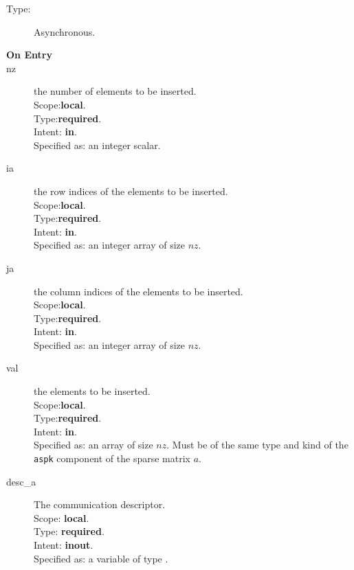 \begin{description}
\item[Type:] Asynchronous.
\item[\bf On Entry]
\item[nz] the number of elements to be inserted.\\
Scope:{\bf local}.\\
Type:{\bf required}.\\
Intent: {\bf in}.\\
Specified as: an integer scalar.
\item[ia] the row indices of the elements to be inserted.\\
Scope:{\bf local}.\\
Type:{\bf required}.\\
Intent: {\bf in}.\\
Specified as: an integer array of size $nz$.
\item[ja] the column indices of the elements to be inserted.\\
Scope:{\bf local}.\\
Type:{\bf required}.\\
Intent: {\bf in}.\\
Specified as: an integer array of size $nz$.
\item[val] the elements to be inserted.\\
Scope:{\bf local}.\\
Type:{\bf required}.\\
Intent: {\bf in}.\\
Specified as: an array of size $nz$. Must be of the same type and kind
of the \verb|aspk| component of the sparse matrix $a$.
\item[desc\_a] The communication descriptor.\\
Scope: {\bf local}. \\
Type: {\bf required}.\\
Intent: {\bf inout}.\\
Specified as: a variable of type \descdata.\\
\end{description}

